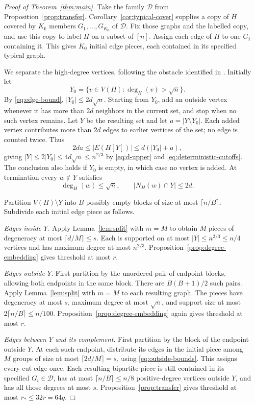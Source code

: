 \documentclass[11pt]{article}
\theoremstyle{remark}
\numberwithin{equation}{section}
\newcommand{\calD}{\mathcal D}
\begin{document}
\begin{proof}[Proof of Theorem~\ref{thm:main}]
Take the family $\calD$ from Proposition~\ref{prop:transfer}.
Corollary~\ref{cor:typical-cover} supplies a copy of $H$ covered
by $K_0$ members $G_1,\ldots,G_{K_0}$ of $\calD$.
Fix those graphs and the labelled copy, and use this copy to
label $H$ on a subset of $[n]$. Assign each edge of $H$ to
one $G_i$ containing it. This gives $K_0$ initial edge pieces,
each contained in its specified typical graph.

We separate the high-degree vertices, following the obstacle
identified in \cite[Section~8]{AHPT26}. Initially let
\[
 Y_0=\{v\in V(H):\deg_H(v)>\sqrt n\}.
\]
By \eqref{eq:edge-bound}, $|Y_0|\leq2d\sqrt n$.
Starting from $Y_0$, add an outside vertex whenever it has more
than $2d$ neighbors in the current set, and stop when no such
vertex remains. Let $Y$ be the resulting set and let
$a=|Y\setminus Y_0|$. Each added vertex contributes more than
$2d$ edges to earlier vertices of the set; no edge is counted
twice. Thus
\[
 2da\leq|E(H[Y])|\leq d(|Y_0|+a),
\]
giving $|Y|\leq2|Y_0|\leq4d\sqrt n\leq n^{2/3}$ by
\eqref{eq:d-upper} and \eqref{eq:deterministic-cutoffs}.
The conclusion also holds if $Y_0$ is empty, in which case no
vertex is added. At termination every $w\notin Y$ satisfies
\begin{equation}\label{eq:outside-bounds}
 \deg_H(w)\leq\sqrt n,\qquad |N_H(w)\cap Y|\leq2d.
\end{equation}

Partition $V(H)\setminus Y$ into $B$ possibly empty blocks
of size at most $\lceil n/B\rceil$. Subdivide each initial
edge piece as follows.

\emph{Edges inside $Y$.}
Apply Lemma~\ref{lem:split} with $m=M$ to obtain $M$ pieces
of degeneracy at most $\lceil d/M\rceil\leq s$.
Each is supported on at most $|Y|\leq n^{2/3}\leq n/4$
vertices and has maximum degree at most $n^{2/3}$.
Proposition~\ref{prop:degree-embedding} gives threshold at most $r$.

\emph{Edges outside $Y$.}
First partition by the unordered pair of endpoint blocks,
allowing both endpoints in the same block. There are
$B(B+1)/2$ such pairs. Apply Lemma~\ref{lem:split} with
$m=M$ to each resulting graph. The pieces have degeneracy
at most $s$, maximum degree at most $\sqrt n$, and support
size at most $2\lceil n/B\rceil\leq n/100$.
Proposition~\ref{prop:degree-embedding} again gives threshold
at most $r$.

\emph{Edges between $Y$ and its complement.}
First partition by the block of the endpoint outside $Y$.
At each such endpoint, distribute its edges in the initial
piece among $M$ groups of size at most $\lceil2d/M\rceil=s$,
using \eqref{eq:outside-bounds}. This assigns every cut edge
once. Each resulting bipartite piece is still contained in its
specified $G_i\in\calD$, has at most $\lceil n/B\rceil\leq n/8$
positive-degree vertices outside $Y$, and has all those degrees
at most $s$. Proposition~\ref{prop:transfer} gives threshold
at most $r_*\leq32r=64q$.


\end{proof}
\end{document}

